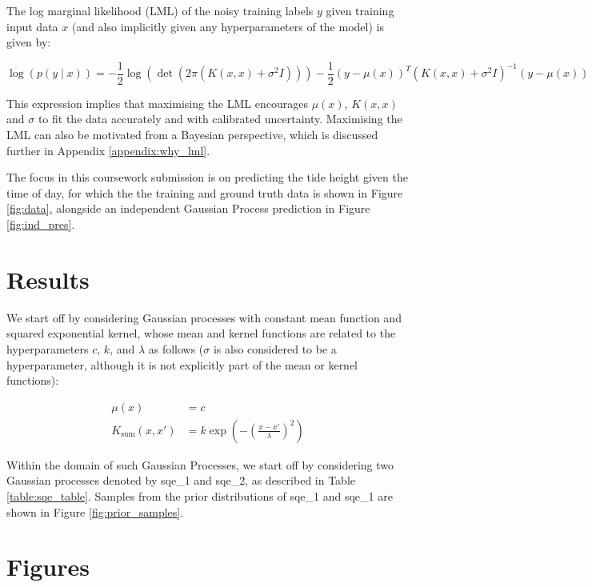 \documentclass{article}
\begin{document}
The log marginal likelihood (LML) of the noisy training labels $y$ given training input data $x$ (and also implicitly given any hyperparameters of the model) is given by:

\begin{equation}
    \log \left( p(y \mid x) \right) = -\frac{1}{2}\log\left(\det \left(2\pi\left( K(x, x) + \sigma^2 I \right)\right)\right) -\frac{1}{2}(y - \mu(x))^T \left( K(x, x) + \sigma^2 I \right)^{-1} (y - \mu(x))
\end{equation}

This expression implies that maximising the LML encourages $\mu(x)$, $K(x,x)$ and $\sigma$ to fit the data accurately and with calibrated uncertainty. Maximising the LML can also be motivated from a Bayesian perspective, which is discussed further in Appendix \ref{appendix:why_lml}.

The focus in this coursework submission is on predicting the tide height given the time of day, for which the the training and ground truth data is shown in Figure \ref{fig:data}, alongside an independent Gaussian Process prediction in Figure \ref{fig:ind_pres}.

\section{Results}

We start off by considering Gaussian processes with constant mean function and squared exponential kernel, whose mean and kernel functions are related to the hyperparameters $c$, $k$, and $\lambda$ as follows ($\sigma$ is also considered to be a hyperparameter, although it is not explicitly part of the mean or kernel functions):

\begin{align}
\mu(x) &= c \\
K_{\mathrm{sum}}(x, x') &= k \exp\left( -\left( \frac{x - x'}{\lambda} \right)^2 \right)
\end{align}

Within the domain of such Gaussian Processes, we start off by considering two Gaussian processes denoted by sqe\_1 and sqe\_2, as described in Table \ref{table:sqe_table}. Samples from the prior distributions of sqe\_1 and sqe\_1 are shown in Figure \ref{fig:prior_samples}.


\appendix

\section{Figures}\label{appendix:figures}
\end{document}
